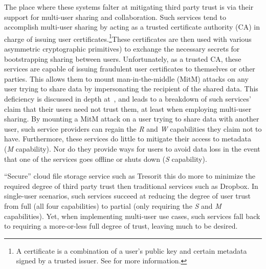 The place where these systems falter at mitigating third party trust
is via their support for multi-user sharing and collaboration. Such
services tend to accomplish multi-user sharing by acting as a trusted
certificate authority (CA) in charge of issuing user
certificates.\footnote{A certificate is a combination of a user's
  public key and certain metadata signed by a trusted issuer. See for
  more information.}These certificates are then used with various
asymmetric cryptographic primitives) to exchange the necessary secrets
for bootstrapping sharing between users. Unfortunately, as a trusted
CA, these services are capable of issuing fraudulent user certificates
to themselves or other parties. This allows them to mount
man-in-the-middle (MitM) attacks on any user trying to share data by
impersonating the recipient of the shared data. This deficiency is
discussed in depth at~\cite{wilson2014}, and leads to a breakdown of
such services' claim that their users need not trust them, at least
when employing multi-user sharing. By mounting a MitM attack on a user
trying to share data with another user, such service providers can
regain the \emph{R} and \emph{W} capabilities they claim not to
have. Furthermore, these services do little to mitigate their access
to metadata (\emph{M} capability). Nor do they provide ways for users
to avoid data loss in the event that one of the services goes offline
or shuts down (\emph{S} capability).

``Secure'' cloud file storage service such as Tresorit this do more to
minimize the required degree of third party trust then traditional
services such as Dropbox. In single-user scenarios, such services
succeed at reducing the degree of user trust from full (all four
capabilities) to partial (only requiring the \emph{S} and \emph{M}
capabilities). Yet, when implementing multi-user use cases, such
services fall back to requiring a more-or-less full degree of trust,
leaving much to be desired.




